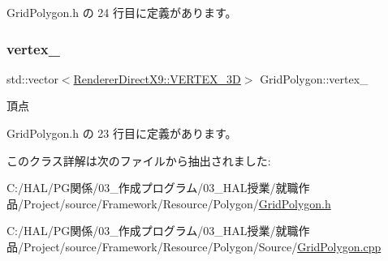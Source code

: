  Grid\+Polygon.\+h の 24 行目に定義があります。

\mbox{\label{class_grid_polygon_a71923f80b111b2868553f9f3600fa192}} 
\subsubsection{\texorpdfstring{vertex\+\_\+}{vertex\_}}
{\footnotesize\ttfamily std\+::vector$<$\mbox{\hyperlink{class_renderer_direct_x9_1_1_v_e_r_t_e_x__3_d}{Renderer\+Direct\+X9\+::\+V\+E\+R\+T\+E\+X\+\_\+3D}}$>$ Grid\+Polygon\+::vertex\+\_\+\hspace{0.3cm}{\ttfamily [private]}}



頂点 



 Grid\+Polygon.\+h の 23 行目に定義があります。



このクラス詳解は次のファイルから抽出されました\+:\begin{DoxyCompactItemize}
\item 
C\+:/\+H\+A\+L/\+P\+G関係/03\+\_\+作成プログラム/03\+\_\+\+H\+A\+L授業/就職作品/\+Project/source/\+Framework/\+Resource/\+Polygon/\mbox{\hyperlink{_grid_polygon_8h}{Grid\+Polygon.\+h}}\item 
C\+:/\+H\+A\+L/\+P\+G関係/03\+\_\+作成プログラム/03\+\_\+\+H\+A\+L授業/就職作品/\+Project/source/\+Framework/\+Resource/\+Polygon/\+Source/\mbox{\hyperlink{_grid_polygon_8cpp}{Grid\+Polygon.\+cpp}}\end{DoxyCompactItemize}
